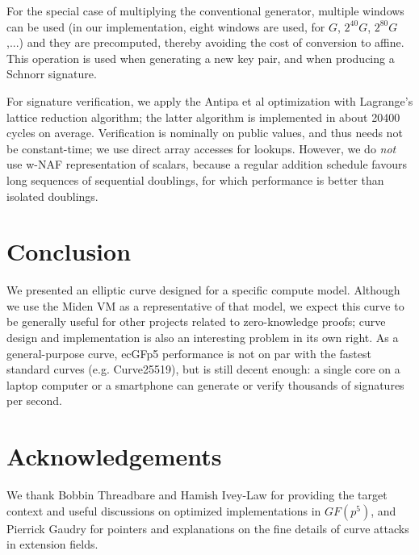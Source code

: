 \documentclass{llncs}
\newcommand{\GF}{GF}
\begin{document}
For the special case of multiplying the conventional generator, multiple
windows can be used (in our implementation, eight windows are used, for
$G$, $2^{40} G$, $2^{80} G$,...) and they are precomputed, thereby
avoiding the cost of conversion to affine. This operation is used when
generating a new key pair, and when producing a Schnorr signature.

For signature verification, we apply the Antipa et al
optimization\cite{AntBroGalLamStrVan2005} with Lagrange's lattice
reduction algorithm\cite{Por2020-2}; the latter algorithm is implemented
in about 20400 cycles on average. Verification is nominally on public
values, and thus needs not be constant-time; we use direct array
accesses for lookups. However, we do \emph{not} use w-NAF representation
of scalars, because a regular addition schedule favours long sequences
of sequential doublings, for which performance is better than isolated
doublings.

\section{Conclusion}

We presented an elliptic curve designed for a specific compute model.
Although we use the Miden VM as a representative of that model, we
expect this curve to be generally useful for other projects related to
zero-knowledge proofs; curve design and implementation is also an
interesting problem in its own right. As a general-purpose curve, ecGFp5
performance is not on par with the fastest standard curves (e.g.
Curve25519), but is still decent enough: a single core on a laptop
computer or a smartphone can generate or verify thousands of signatures
per second.

\section*{Acknowledgements}

We thank Bobbin Threadbare and Hamish Ivey-Law for providing the target
context and useful discussions on optimized implementations in
$\GF(p^5)$, and Pierrick Gaudry for pointers and explanations on the
fine details of curve attacks in extension fields.
\end{document}

